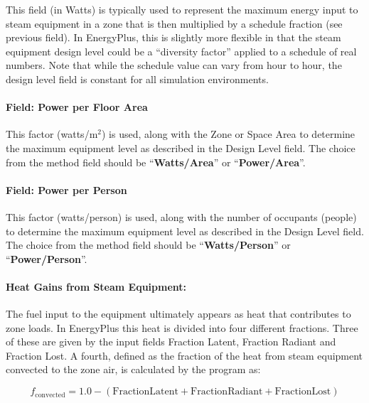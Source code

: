 This field (in Watts) is typically used to represent the maximum energy input to steam equipment in a zone that is then multiplied by a schedule fraction (see previous field). In EnergyPlus, this is slightly more flexible in that the steam equipment design level could be a ``diversity factor'' applied to a schedule of real numbers. Note that while the schedule value can vary from hour to hour, the design level field is constant for all simulation environments.

\paragraph{Field: Power per Floor Area}\label{field-power-per-zone-floor-area-2}

This factor (watts/m\(^{2}\)) is used, along with the Zone or Space Area to determine the maximum equipment level as described in the Design Level field. The choice from the method field should be ``\textbf{Watts/Area}'' or ``\textbf{Power/Area}''.

\paragraph{Field: Power per Person}\label{field-power-per-person-2}

This factor (watts/person) is used, along with the number of occupants (people) to determine the maximum equipment level as described in the Design Level field. The choice from the method field should be ``\textbf{Watts/Person}'' or ``\textbf{Power/Person}''.

\paragraph{Heat Gains from Steam Equipment:}\label{heat-gains-from-steam-equipment}

The fuel input to the equipment ultimately appears as heat that contributes to zone loads. In EnergyPlus this heat is divided into four different fractions. Three of these are given by the input fields Fraction Latent, Fraction Radiant and Fraction Lost. A fourth, defined as the fraction of the heat from steam equipment convected to the zone air, is calculated by the program as:

\begin{equation}
  f_{\mathrm{convected}} = 1.0 - (\mathrm{Fraction Latent} + \mathrm{Fraction Radiant} + \mathrm{Fraction Lost})
\end{equation}

